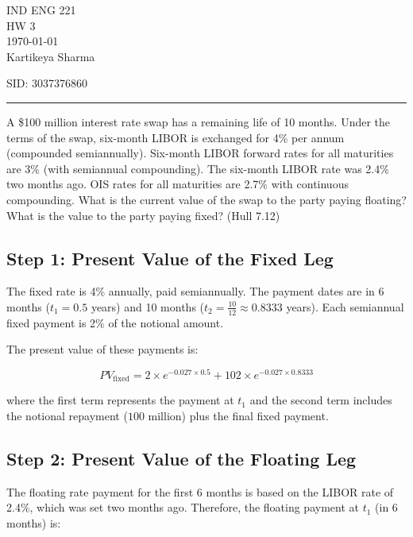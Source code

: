 \documentclass[12pt,letterpaper, onecolumn]{exam}
\begin{document}
\begingroup  
    \centering
    \LARGE IND ENG 221\\
    \LARGE HW 3\\[0.5em]
    \large \today\\[0.5em]
    \large Kartikeya Sharma\par
    \large SID: 3037376860\par
\endgroup
\rule{\textwidth}{0.4pt}
\pointsdroppedatright   %
\printanswers
\renewcommand{\solutiontitle}{\noindent\textbf{Ans:}\enspace}   %

\begin{questions}

    \question A \$100 million interest rate swap has a remaining life of 10 months. Under the terms
of the swap, six-month LIBOR is exchanged for 4\% per annum (compounded
semiannually). Six-month LIBOR forward rates for all maturities are 3\% (with
semiannual compounding). The six-month LIBOR rate was 2.4\% two months ago. OIS
rates for all maturities are 2.7\% with continuous compounding. What is the current value
of the swap to the party paying floating? What is the value to the party paying fixed?
(Hull 7.12)
    
    \begin{solution}

    \subsection*{Step 1: Present Value of the Fixed Leg}
The fixed rate is 4\% annually, paid semiannually. The payment dates are in 6 months ($t_1 = 0.5$ years) and 10 months ($t_2 = \frac{10}{12} \approx 0.8333$ years). Each semiannual fixed payment is 2\% of the notional amount. 

The present value of these payments is:

\[
PV_{\text{fixed}} = 2 \times e^{-0.027 \times 0.5} + 102 \times e^{-0.027 \times 0.8333}
\]

where the first term represents the payment at $t_1$ and the second term includes the notional repayment ($100$ million) plus the final fixed payment.

\subsection*{Step 2: Present Value of the Floating Leg}
The floating rate payment for the first 6 months is based on the LIBOR rate of 2.4\%, which was set two months ago. Therefore, the floating payment at $t_1$ (in 6 months) is:


\end{solution}
\end{questions}
\end{document}
